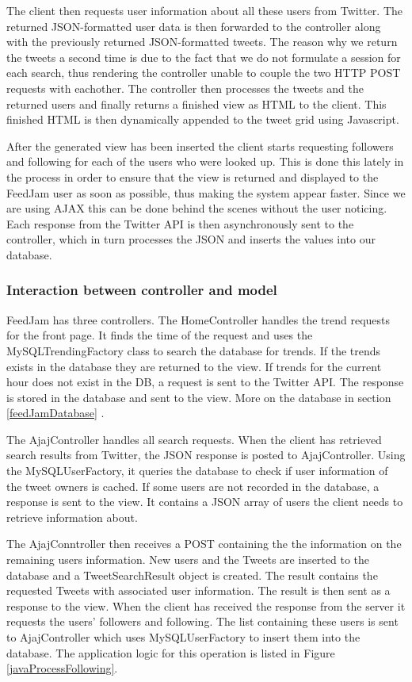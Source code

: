 The client then requests user information about all these users from Twitter. The returned JSON-formatted user data is then forwarded to the controller along with the previously returned JSON-formatted tweets. The reason why we return the tweets a second time is due to the fact that we do not formulate a session for each search, thus rendering the controller unable to couple the two HTTP POST requests with eachother. The controller then processes the tweets and the returned users and finally returns a finished view as HTML to the client. This finished HTML is then dynamically appended to the tweet grid using Javascript.

After the generated view has been inserted the client starts requesting followers and following for each of the users who were looked up. This is done this lately in the process in order to ensure that the view is returned and displayed to the FeedJam user as soon as possible, thus making the system appear faster. Since we are using AJAX this can be done behind the scenes without the user noticing. Each response from the Twitter API is then asynchronously sent to the controller, which in turn processes the JSON and inserts the values into our database.

\subsubsection{Interaction between controller and model} %
FeedJam has three controllers. The HomeController handles the trend requests for the front page. It finds the time of the request and uses the MySQLTrendingFactory class to search the database for trends. If the trends exists in the database they are returned to the view. If trends for the current hour does not exist in the DB, a request is sent to the  Twitter API. The response is stored in the database and sent to the view. More on the database in section \ref{feedJamDatabase} .

The AjajController handles all search requests. When the client has retrieved search results from Twitter, the JSON response is posted to AjajController. Using the MySQLUserFactory, it queries the database to check if user information of the tweet owners is cached. If some users are not recorded in the database, a response is sent to the view. It contains a JSON array of users the client needs to retrieve information about. 

The AjajConntroller then receives a POST containing the the information on the remaining users information. New users and the Tweets are inserted to the database and a TweetSearchResult object is created. The result contains the requested Tweets with associated user information. The result is then sent as a response to the view. When the client has received the response from the server it requests the users' followers and following. The list containing these users is sent to AjajController which uses MySQLUserFactory to insert them into the database. The application logic for this operation is listed in Figure \ref{javaProcessFollowing}.


